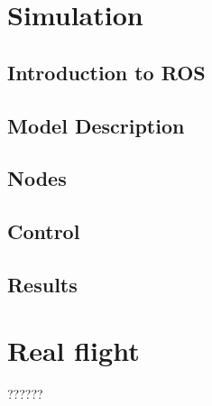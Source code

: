 \chapter{Simulation}
\label{sec:simu}
\section{Introduction to ROS}
\section{Model Description}
\section{Nodes}
\section{Control}
\section{Results}
\chapter{Real flight}
??????
